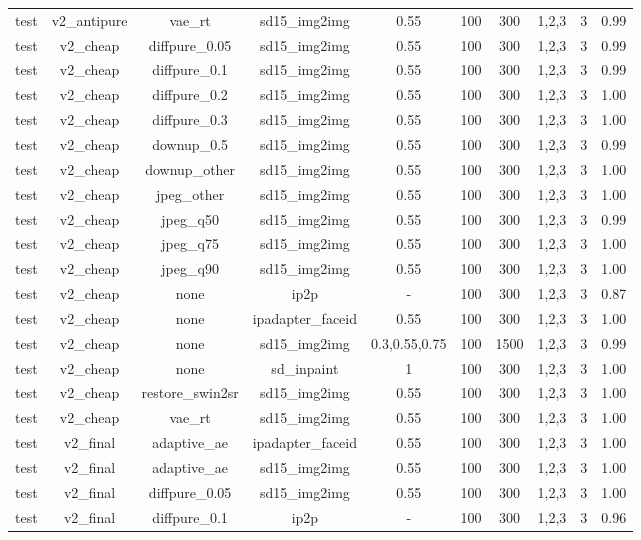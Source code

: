 \begin{table}[t]
{\begin{tabular}{lccccccccc}
test & v2\_antipure & vae\_rt & sd15\_img2img & 0.55 & 100 & 300 & 1,2,3 & 3 & 0.99 \\
test & v2\_cheap & diffpure\_0.05 & sd15\_img2img & 0.55 & 100 & 300 & 1,2,3 & 3 & 0.99 \\
test & v2\_cheap & diffpure\_0.1 & sd15\_img2img & 0.55 & 100 & 300 & 1,2,3 & 3 & 0.99 \\
test & v2\_cheap & diffpure\_0.2 & sd15\_img2img & 0.55 & 100 & 300 & 1,2,3 & 3 & 1.00 \\
test & v2\_cheap & diffpure\_0.3 & sd15\_img2img & 0.55 & 100 & 300 & 1,2,3 & 3 & 1.00 \\
test & v2\_cheap & downup\_0.5 & sd15\_img2img & 0.55 & 100 & 300 & 1,2,3 & 3 & 0.99 \\
test & v2\_cheap & downup\_other & sd15\_img2img & 0.55 & 100 & 300 & 1,2,3 & 3 & 1.00 \\
test & v2\_cheap & jpeg\_other & sd15\_img2img & 0.55 & 100 & 300 & 1,2,3 & 3 & 1.00 \\
test & v2\_cheap & jpeg\_q50 & sd15\_img2img & 0.55 & 100 & 300 & 1,2,3 & 3 & 0.99 \\
test & v2\_cheap & jpeg\_q75 & sd15\_img2img & 0.55 & 100 & 300 & 1,2,3 & 3 & 1.00 \\
test & v2\_cheap & jpeg\_q90 & sd15\_img2img & 0.55 & 100 & 300 & 1,2,3 & 3 & 1.00 \\
test & v2\_cheap & none & ip2p & - & 100 & 300 & 1,2,3 & 3 & 0.87 \\
test & v2\_cheap & none & ipadapter\_faceid & 0.55 & 100 & 300 & 1,2,3 & 3 & 1.00 \\
test & v2\_cheap & none & sd15\_img2img & 0.3,0.55,0.75 & 100 & 1500 & 1,2,3 & 3 & 0.99 \\
test & v2\_cheap & none & sd\_inpaint & 1 & 100 & 300 & 1,2,3 & 3 & 1.00 \\
test & v2\_cheap & restore\_swin2sr & sd15\_img2img & 0.55 & 100 & 300 & 1,2,3 & 3 & 1.00 \\
test & v2\_cheap & vae\_rt & sd15\_img2img & 0.55 & 100 & 300 & 1,2,3 & 3 & 1.00 \\
test & v2\_final & adaptive\_ae & ipadapter\_faceid & 0.55 & 100 & 300 & 1,2,3 & 3 & 1.00 \\
test & v2\_final & adaptive\_ae & sd15\_img2img & 0.55 & 100 & 300 & 1,2,3 & 3 & 1.00 \\
test & v2\_final & diffpure\_0.05 & sd15\_img2img & 0.55 & 100 & 300 & 1,2,3 & 3 & 1.00 \\
test & v2\_final & diffpure\_0.1 & ip2p & - & 100 & 300 & 1,2,3 & 3 & 0.96 \\

\end{tabular}}
\end{table}
